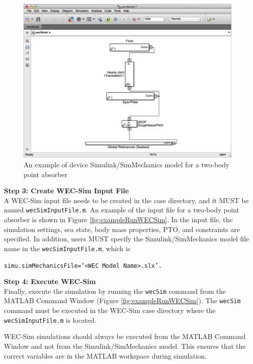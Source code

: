 \begin{figure}[H]
\noindent \begin{centering}
\includegraphics[scale=0.5]{gettingStarted/Figures/exampleWecModel}\protect\caption{An example of device Simulink/SimMechanics model for a two-body point
absorber}
\label{fig:wecModel}
\par\end{centering}
\end{figure}

\textbf{Step 3: Create WEC-Sim Input File}\\
A WEC-Sim input file needs to be created in the case directory, and it MUST be named \texttt{wecSimInputFile.m}. An example of the input file for a two-body point absorber is shown in Figure \ref{fig:exampleRunWECSim}. In the input file, the simulation settings, sea state, body mass properties, PTO, and constraints are specified. In addition, users MUST specify the Simulink/SimMechanics model file name in the \texttt{wecSimInputFile.m}, which is

\begin{center}\texttt{\qquad{}simu.simMechanicsFile='<WEC Model Name>.slx'.}\end{center}

\textbf{Step 4: Execute WEC-Sim}\\
Finally, execute the simulation by running the \texttt{wecSim} command from the MATLAB Command Window (Figure \ref{fig:exampleRunWECSim}). The \texttt{wecSim} command must be executed in the WEC-Sim case directory where the \texttt{wecSimInputFile.m} is located.

WEC-Sim simulations should always be executed from the MATLAB Command Window and not from the Simulink/SimMechanics model. This ensures that the correct variables are in the MATLAB workspace during simulation. 

